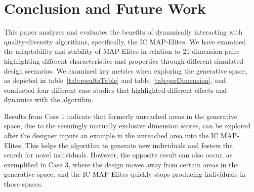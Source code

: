 \section{Conclusion and Future Work}

This paper analyzes and evaluates the benefits of dynamically interacting with quality-diversity algorithms, specifically, the IC MAP-Elites. We have examined the adaptability and stability of MAP-Elites in relation to 21 dimension pairs highlighting different characteristics and properties through different simulated design scenarios. We examined key metrics when exploring the generative space, as depicted in table~\ref{tab:resultsTable} and table~\ref{tab:perDimension}, and conducted four different case studies that highlighted different effects and dynamics with the algorithm.



Results from Case 1 indicate that formerly unreached areas in the generative space, due to the seemingly mutually exclusive dimension scores, can be explored after the designer inputs an example in the unreached area into the IC MAP-Elites. This helps the algorithm to generate new individuals and fosters the search for novel individuals. However, the opposite result can also occur, as exemplified in Case 3, where the design moves away from certain areas in the generative space, and the IC MAP-Elites quickly stops producing individuals in those spaces.


